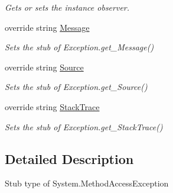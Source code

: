 \begin{DoxyCompactItemize}
\begin{DoxyCompactList}\small\item\em Gets or sets the instance observer.\end{DoxyCompactList}\item 
override string \hyperlink{class_system_1_1_fakes_1_1_stub_method_access_exception_aa3b48e6a57f1c27c079d5067a53cbf2e}{Message}
\begin{DoxyCompactList}\small\item\em Sets the stub of Exception.\-get\-\_\-\-Message()\end{DoxyCompactList}\item 
override string \hyperlink{class_system_1_1_fakes_1_1_stub_method_access_exception_a6946332820c256c8f50c166f5de31179}{Source}
\begin{DoxyCompactList}\small\item\em Sets the stub of Exception.\-get\-\_\-\-Source()\end{DoxyCompactList}\item 
override string \hyperlink{class_system_1_1_fakes_1_1_stub_method_access_exception_a08797035dc6e96e20fe3fba9718ccec8}{Stack\-Trace}
\begin{DoxyCompactList}\small\item\em Sets the stub of Exception.\-get\-\_\-\-Stack\-Trace()\end{DoxyCompactList}\end{DoxyCompactItemize}


\subsection{Detailed Description}
Stub type of System.\-Method\-Access\-Exception



